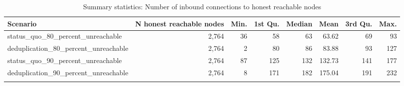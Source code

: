 \begingroup
\begin{longtable}{lrrrrrrr}
\caption{
{Summary statistics: Number of inbound connections to honest reachable nodes}
} \\ 
\toprule
Scenario & N honest reachable nodes & Min. & 1st Qu. & Median & Mean & 3rd Qu. & Max. \\ 
\midrule\addlinespace[2.5pt]
status\_quo\_80\_percent\_unreachable & 2,764 & 36 & 58 & 63 & 63.62 & 69 & 93 \\ 
deduplication\_80\_percent\_unreachable & 2,764 & 2 & 80 & 86 & 83.88 & 93 & 127 \\ 
status\_quo\_90\_percent\_unreachable & 2,764 & 87 & 125 & 132 & 132.73 & 141 & 177 \\ 
deduplication\_90\_percent\_unreachable & 2,764 & 8 & 171 & 182 & 175.04 & 191 & 232 \\ 
\bottomrule
\label{table-inbound-summary}
\end{longtable}
\endgroup
